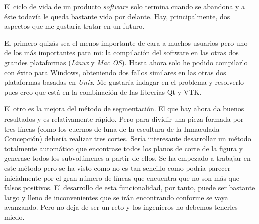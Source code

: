 El ciclo de vida de un producto \textit{software} solo termina cuando se abandona y a éste todavía le queda bastante vida por delante. Hay, principalmente, dos aspectos que me gustaría tratar en un futuro.

El primero quizás sea el menos importante de cara a muchos usuarios pero uno de los más importantes para mi: la compilación del software en las otras dos grandes plataformas (\textit{Linux} y \textit{Mac OS}). Hasta ahora solo he podido compilarlo con éxito para Windows, obteniendo dos fallos similares en las otras dos plataformas basadas en \textit{Unix}. Me gustaría indagar en el problema y resolverlo pues creo que está en la combinación de las librerías Qt y VTK.

El otro es la mejora del método de segmentación. El que hay ahora da buenos resultados y es relativamente rápido. Pero para dividir una pieza formada por tres líneas (como los cuernos de luna de la escultura de la Inmaculada Concepción) debería realizar tres cortes. Sería interesante desarrollar un método totalmente automático que encontrase todos los planos de corte de la figura y generase todos los subvolúmenes a partir de ellos. Se ha empezado a trabajar en este método pero se ha visto como no es tan sencillo como podría parecer inicialmente por el gran número de líneas que encuentra que no son más que falsos positivos. El desarrollo de esta funcionalidad, por tanto, puede ser bastante largo y lleno de inconvenientes que se irán encontrando conforme se vaya avanzando. Pero no deja de ser un reto y los ingenieros no debemos tenerles miedo.